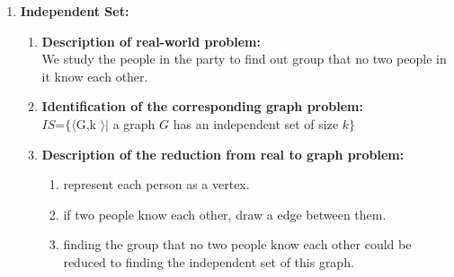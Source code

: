 \documentclass[article, 10pt,onecolumn]{article}
\begin{document}
\begin{enumerate}
\item \textbf{Independent Set:}
\begin{enumerate}
 		\item\textbf{Description of real-world problem:} \\
   		We study the people in the party to find out group that no two people in it know each other.
  	\item\textbf{Identification of the corresponding graph problem:}\\
  		$IS$=$\{\langle $G,k $ \rangle | $ a graph $G$ has an independent set of size $k\}$
  	\item \textbf{Description of the reduction from real to graph problem:}	
  		\begin{enumerate}
			\item represent each person as a vertex.
			\item if two people know each other, draw a edge between them.
			\item finding the group that no two people know each other could be reduced to finding the independent set of this graph.
			\end{enumerate}
  	

\end{enumerate}
\end{enumerate}
\end{document}
